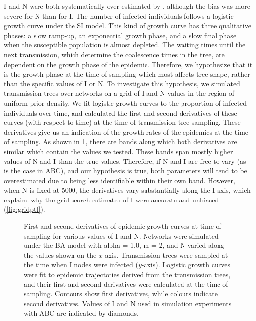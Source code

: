\gls{I} and \gls{N} were both systematically over-estimated by
, although the bias was more severe for \gls{N} than for
\gls{I}. The number of infected individuals follows a logistic growth curve
under the \gls{SI} model. This kind of growth curve has three qualitative
phases: a slow ramp-up, an exponential growth phase, and a slow final phase
when the susceptible population is almost depleted. The waiting times until the
next transmission, which determine the coalescence times in the tree, are
dependent on the growth phase of the epidemic. Therefore, we hypothesize that
it is the growth phase at the time of sampling which most affects tree shape,
rather than the specific values of \gls{I} or \gls{N}. To investigate this
hypothesis, we simulated transmission trees over networks on a grid of \gls{I}
and \gls{N} values in the region of uniform prior density. We fit logistic
growth curves to the proportion of infected individuals over time, and
calculated the first and second derivatives of these curves (with respect to
time) at the time of transmission tree sampling. These derivatives give us an
indication of the growth rates of the epidemics at the time of sampling. As
shown in \cref{fig:derivs}, there are bands along which both derivatives are
similar which contain the values we tested. These bands span mostly higher
values of \gls{N} and \gls{I} than the true values. Therefore, if \gls{N} and
\gls{I} are free to vary (as is the case in \gls{ABC}), and our hypothesis is
true, both parameters will tend to be overestimated due to being less
identifiable within their own band. However, when \gls{N} is fixed at 5000, the
derivatives vary substantially along the \gls{I}-axis, which explains why the
grid search estimates of \gls{I} were accurate and unbiased
(\cref{fig:gridptI}).

\begin{figure}[ht]
  \centering
  \caption[
    First and second time derivatives of epidemic growth curves at time of
    sampling for various values of $I$ and $N$.
  ]{
    First and second  derivatives of epidemic growth curves at time
    of sampling for various values of \gls{I} and \gls{N}. Networks were
    simulated under the \gls{BA} model with \gls{alpha} = 1.0, \gls{m} = 2, and
    \gls{N} varied along the values shown on the $x$-axis. Transmission trees
    were sampled at the time when \gls{I} nodes were infected ($y$-axis).
    Logistic growth curves were fit to epidemic trajectories derived from the
    transmission trees, and their first and second derivatives were calculated
    at the time of sampling. Contours show first derivatives, while colours
    indicate second derivatives. Values of \gls{I} and \gls{N} used in
    simulation experiments with \gls{ABC} are indicated by diamonds.
  }
  \label{fig:derivs}
\end{figure}

